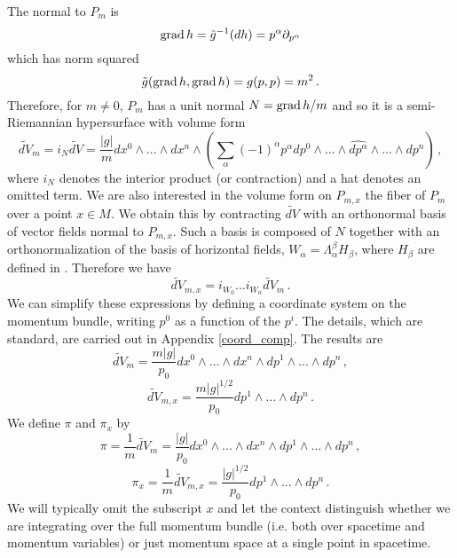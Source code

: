The normal to $P_m$ is 
\begin{equation}
\operatorname{grad} h=\tilde{g}^{-1}(dh)=p^\alpha\partial_{p^\alpha}
\end{equation}
which has norm squared 
\begin{equation}
\tilde{g}(\operatorname{grad} h,\operatorname{grad} h)=g(p,p)=m^2\,.
\end{equation}
Therefore, for $m\neq 0$, $P_m$ has a unit normal $N=\operatorname{grad} h/m$ and so it is a semi-Riemannian hypersurface with volume form
\begin{equation}
\widetilde{dV}_m=i_N \widetilde{dV}=\frac{|g|}{m}dx^0\wedge...\wedge dx^n\wedge\left(\sum_\alpha (-1)^\alpha p^\alpha dp^0\wedge...\wedge\widehat{dp^\alpha}\wedge...\wedge dp^n\right)\,,
\end{equation}
where $i_N$ denotes the interior product (or contraction) and a hat denotes an omitted term.  We are also interested in the volume form on $P_{m,x}$ the fiber of $P_m$ over a point $x\in M$.  We obtain this by contracting $\widetilde{dV}$ with an orthonormal basis of vector fields normal to $P_{m,x}$. Such a basis is composed of $N$ together with an orthonormalization of the basis of horizontal fields, $W_\alpha=\Lambda^\beta_\alpha H_\beta$, where $H_\beta$ are defined in . Therefore we have
\begin{equation}
\widetilde{dV}_{m,x}=i_{W_0}...i_{W_n}\widetilde{dV}_m\,.
\end{equation}
 We can simplify these expressions by defining a coordinate system on the momentum bundle, writing $p^0$ as a function of the $p^i$.  The details, which are standard, are carried  out in Appendix  \ref{coord_comp}.  The results are
\begin{equation}
\widetilde{dV}_m=\frac{m|g|}{p_0}dx^0\wedge...\wedge dx^n\wedge dp^1\wedge...\wedge dp^n\,,
\end{equation}
\begin{equation}
\widetilde{dV}_{m,x}=\frac{m|g|^{1/2}}{p_0}dp^1\wedge...\wedge dp^n\,.
\end{equation}
We define $\pi$ and $\pi_x$ by
\begin{equation}
\pi=\frac{1}{m}\widetilde{dV}_m=\frac{|g|}{p_0}dx^0\wedge...\wedge dx^n\wedge dp^1\wedge...\wedge dp^n\,,
\end{equation}
\begin{equation}\label{pi_x}
\pi_x=\frac{1}{m}\widetilde{dV}_{m,x}=\frac{|g|^{1/2}}{p_0}dp^1\wedge...\wedge dp^n\,.
\end{equation}
We will typically omit the subscript $x$ and let the context distinguish whether we are integrating over the full momentum bundle (i.e. both over spacetime and momentum variables) or just momentum space at a single point in spacetime.  \\

